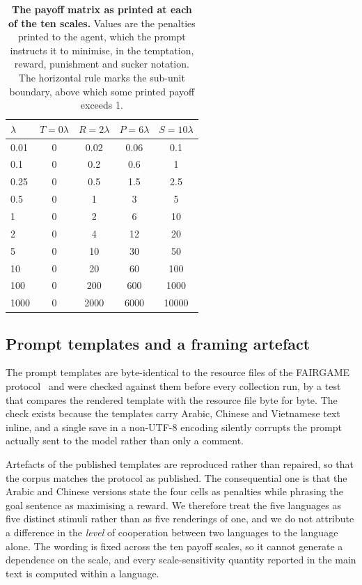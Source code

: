 \documentclass[openacc]{rsproca_new}
\newcommand{\lam}{\lambda}
\begin{document}
\begin{table}[htbp]
\centering
\footnotesize
\caption{\textbf{The payoff matrix as printed at each of the ten scales.}
Values are the penalties printed to the agent, which the prompt instructs it
to minimise, in the temptation, reward,
punishment and sucker notation. The horizontal rule marks the sub-unit
boundary, above which some printed payoff exceeds 1.}
\label{tab:A-lambdas}
\begin{tabular}{@{}lcccc@{}}
\toprule
$\lam$ & $T = 0\lam$ & $R = 2\lam$ & $P = 6\lam$ & $S = 10\lam$ \\
\midrule
0.01   & 0 & 0.02 & 0.06 & 0.1 \\
0.1    & 0 & 0.2  & 0.6  & 1 \\
\midrule
0.25   & 0 & 0.5  & 1.5  & 2.5 \\
0.5    & 0 & 1    & 3    & 5 \\
1      & 0 & 2    & 6    & 10 \\
2      & 0 & 4    & 12   & 20 \\
5      & 0 & 10   & 30   & 50 \\
10     & 0 & 20   & 60   & 100 \\
100    & 0 & 200  & 600  & 1000 \\
1000   & 0 & 2000 & 6000 & 10000 \\
\bottomrule
\end{tabular}
\end{table}

\subsection{Prompt templates and a framing artefact}\label{appendix:templates}

The prompt templates are byte-identical to the resource files of the FAIRGAME
protocol~\cite{buscemi2025fairgame} and were checked against them before every
collection run, by a test that compares the rendered template with the resource
file byte for byte. The check exists because the templates carry Arabic,
Chinese and Vietnamese text inline, and a single save in a non-UTF-8 encoding
silently corrupts the prompt actually sent to the model rather than only a
comment.

Artefacts of the published templates are reproduced rather than repaired, so
that the corpus matches the protocol as published. The consequential one is
that the Arabic and Chinese versions state the four cells as penalties while
phrasing the goal sentence as maximising a reward. We therefore treat the five
languages as five distinct stimuli rather than as five renderings of one, and
we do not attribute a difference in the \emph{level} of cooperation between two
languages to the language alone. The wording is fixed across the ten payoff
scales, so it cannot generate a dependence on the scale, and every
scale-sensitivity quantity reported in the main text is computed within a
language.
\end{document}
